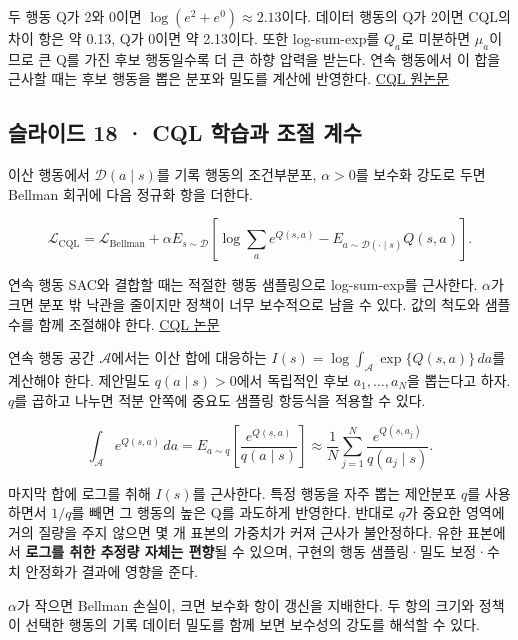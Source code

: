 \documentclass[11pt,a4paper]{article}
\begin{document}
두 행동 Q가 2와 0이면 $\log(e^2+e^0)\approx2.13$이다. 데이터 행동의 Q가 2이면 CQL의 차이 항은 약 0.13, Q가 0이면 약 2.13이다. 또한 log-sum-exp를 $Q_a$로 미분하면 $\mu_a$이므로 큰 Q를 가진 후보 행동일수록 더 큰 하향 압력을 받는다. 연속 행동에서 이 합을 근사할 때는 후보 행동을 뽑은 분포와 밀도를 계산에 반영한다. \href{https://arxiv.org/abs/2006.04779}{CQL 원논문}\par

\subsection{슬라이드 18 · CQL 학습과 조절 계수}

이산 행동에서 $\mathcal D(a\mid s)$를 기록 행동의 조건부분포, $\alpha>0$를 보수화 강도로 두면 Bellman 회귀에 다음 정규화 항을 더한다.\par

\[
\mathcal L_{\mathrm{CQL}}
=\mathcal L_{\mathrm{Bellman}}
+\alpha E_{s\sim\mathcal D}
\left[\log\sum_a e^{Q(s,a)}
-E_{a\sim\mathcal D(\cdot\mid s)}Q(s,a)\right].
\]

연속 행동 SAC와 결합할 때는 적절한 행동 샘플링으로 log-sum-exp를 근사한다. $\alpha$가 크면 분포 밖 낙관을 줄이지만 정책이 너무 보수적으로 남을 수 있다. 값의 척도와 샘플 수를 함께 조절해야 한다. \href{https://arxiv.org/abs/2006.04779}{CQL 논문}\par

연속 행동 공간 $\mathcal A$에서는 이산 합에 대응하는 $I(s)=\log\int_{\mathcal A}\exp\{Q(s,a)\}\,da$를 계산해야 한다. 제안밀도 $q(a\mid s)>0$에서 독립적인 후보 $a_1,\ldots,a_N$을 뽑는다고 하자. $q$를 곱하고 나누면 적분 안쪽에 중요도 샘플링 항등식을 적용할 수 있다.\par

\[
\int_{\mathcal A}e^{Q(s,a)}\,da
=E_{a\sim q}\!\left[\frac{e^{Q(s,a)}}{q(a\mid s)}\right]
\approx\frac1N\sum_{j=1}^N\frac{e^{Q(s,a_j)}}{q(a_j\mid s)}.
\]

마지막 합에 로그를 취해 $I(s)$를 근사한다. 특정 행동을 자주 뽑는 제안분포 $q$를 사용하면서 $1/q$를 빼면 그 행동의 높은 Q를 과도하게 반영한다. 반대로 $q$가 중요한 영역에 거의 질량을 주지 않으면 몇 개 표본의 가중치가 커져 근사가 불안정하다. 유한 표본에서 \textbf{로그를 취한 추정량 자체는 편향}될 수 있으며, 구현의 행동 샘플링·밀도 보정·수치 안정화가 결과에 영향을 준다.\par

$\alpha$가 작으면 Bellman 손실이, 크면 보수화 항이 갱신을 지배한다. 두 항의 크기와 정책이 선택한 행동의 기록 데이터 밀도를 함께 보면 보수성의 강도를 해석할 수 있다.\par
\end{document}
